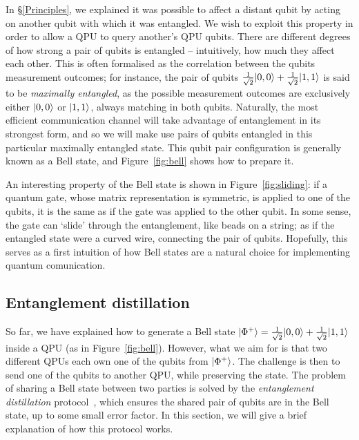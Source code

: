 In \S\ref{Principles}, we explained it was possible to affect a distant qubit by acting on another qubit with which it was entangled. We wish to exploit this property in order to allow a QPU to query another's QPU qubits. There are different degrees of how strong a pair of qubits is entangled -- intuitively, how much they affect each other. This is often formalised as the correlation between the qubits measurement outcomes; for instance, the pair of qubits \(\frac{1}{\sqrt{2}}\vert 0,0 \rangle + \frac{1}{\sqrt{2}}\vert 1,1 \rangle\) is said to be \textit{maximally entangled}, as the possible measurement outcomes are exclusively either \(\vert 0,0 \rangle\) or \(\vert 1,1 \rangle\), always matching in both qubits. Naturally, the most efficient communication channel will take advantage of entanglement in its strongest form, and so we will make use pairs of qubits entangled in this particular maximally entangled state. This qubit pair configuration is generally known as a Bell state, and Figure~\ref{fig:bell} shows how to prepare it.



An interesting property of the Bell state is shown in Figure~\ref{fig:sliding}: if a quantum gate, whose matrix representation is symmetric, is applied to one of the qubits, it is the same as if the gate was applied to the other qubit. In some sense, the gate can `slide' through the entanglement, like beads on a string; as if the entangled state were a curved wire, connecting the pair of qubits. Hopefully, this serves as a first intuition of how Bell states are a natural choice for implementing quantum comunication.



\subsection{Entanglement distillation}
\label{Distillation}

So far, we have explained how to generate a Bell state \(\vert \Phi^+ \rangle = \frac{1}{\sqrt{2}}\vert 0,0 \rangle + \frac{1}{\sqrt{2}}\vert 1,1 \rangle\) inside a QPU (as in Figure~\ref{fig:bell}). However, what we aim for is that two different QPUs each own one of the qubits from \(\vert \Phi^+ \rangle\). The challenge is then to send one of the qubits to another QPU, while preserving the state. The problem of sharing a Bell state between two parties is solved by the \textit{entanglement distillation} protocol~\citep{DistillationProtocol}, which ensures the shared pair of qubits are in the Bell state, up to some small error factor. In this section, we will give a brief explanation of how this protocol works.

